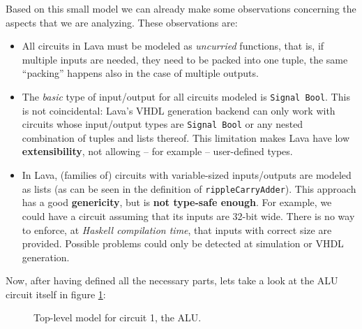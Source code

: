 \documentclass[a4paper]{article}
\begin{document}
                Based on this small model we can already make some observations concerning the
                aspects that we are analyzing. These observations are:
                \begin{itemize}
                    \item All circuits in Lava must be modeled as \emph{uncurried} functions, that
                        is, if multiple inputs are needed, they need to be packed into one tuple, the
                        same ``packing'' happens also in the case of multiple outputs.

                    \item The \emph{basic} type of input/output for all circuits modeled is
                        \texttt{Signal Bool}. This is not coincidental: Lava's VHDL generation
                        backend can only work with circuits whose input/output types are
                        \texttt{Signal Bool} or any nested combination of tuples and lists thereof.
                        This limitation makes Lava have low \textbf{extensibility}, not allowing
                        -- for example -- user-defined types.

                    \item In Lava, (families of) circuits with variable-sized inputs/outputs are
                        modeled as lists (as can be seen in the definition of
                        \texttt{rippleCarryAdder}). This approach has a good \textbf{genericity},
                        but is \textbf{not type-safe enough}. For example, we could have a circuit
                        assuming that its inputs are 32-bit wide.  There is no way to enforce, at
                        \emph{Haskell compilation time}, that inputs with correct size are
                        provided.  Possible problems could only be detected at simulation or VHDL
                        generation.
                \end{itemize}

                Now, after having defined all the necessary parts, lets take a look at the
                ALU circuit itself in figure \ref{fig:lava-circuit1-model-alu}:
                \begin{figure}[h!]
                    \begin{center}
                        
                    \end{center}
                    \caption{Top-level model for circuit 1, the ALU.
                        \label{fig:lava-circuit1-model-alu}}
                \end{figure}
\end{document}
